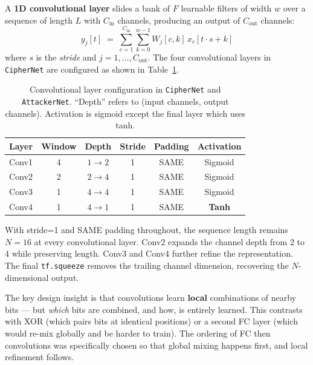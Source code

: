 \documentclass[12pt, a4paper]{article}
\newcommand{\code}[1]{\texttt{\color{CodeRed}#1}}
\begin{document}
A \textbf{1D convolutional layer} slides a bank of $F$ learnable filters
of width $w$ over a sequence of length $L$ with $C_{\text{in}}$ channels,
producing an output of $C_{\text{out}}$ channels:
%
\begin{equation}
  y_j[t] \;=\; \sum_{c=1}^{C_{\text{in}}} \sum_{k=0}^{w-1}
               W_j[c,k]\, x_c[t \cdot s + k]
  \label{eq:conv1d}
\end{equation}
%
where $s$ is the \emph{stride} and $j = 1, \ldots, C_{\text{out}}$.
The four convolutional layers in \code{CipherNet} are configured as shown
in Table~\ref{tab:conv_layers}.

\begin{table}[H]
  \centering
  \caption{Convolutional layer configuration in \code{CipherNet} and
           \code{AttackerNet}. ``Depth'' refers to (input channels,
           output channels). Activation is sigmoid except the final
           layer which uses tanh.}
  \label{tab:conv_layers}
  \begin{tabular}{@{} c c c c c c @{}}
    \toprule
    \textbf{Layer} & \textbf{Window} & \textbf{Depth} &
    \textbf{Stride} & \textbf{Padding} & \textbf{Activation} \\
    \midrule
    Conv1 & 4 & $1 \to 2$ & 1 & SAME & Sigmoid \\
    Conv2 & 2 & $2 \to 4$ & 1 & SAME & Sigmoid \\
    Conv3 & 1 & $4 \to 4$ & 1 & SAME & Sigmoid \\
    Conv4 & 1 & $4 \to 1$ & 1 & SAME & \textbf{Tanh} \\
    \bottomrule
  \end{tabular}
\end{table}

\noindent With stride=1 and SAME padding throughout, the sequence length
remains $N=16$ at every convolutional layer. Conv2 expands the channel
depth from 2 to 4 while preserving length. Conv3 and Conv4 further
refine the representation. The final \code{tf.squeeze} removes the
trailing channel dimension, recovering the $N$-dimensional output.

The key design insight is that convolutions learn \textbf{local}
combinations of nearby bits — but \emph{which} bits are combined, and
how, is entirely learned. This contrasts with XOR (which pairs bits at
identical positions) or a second FC layer (which would re-mix globally
and be harder to train). The ordering of FC then convolutions was
specifically chosen so that global mixing happens first, and local
refinement follows.
\end{document}
